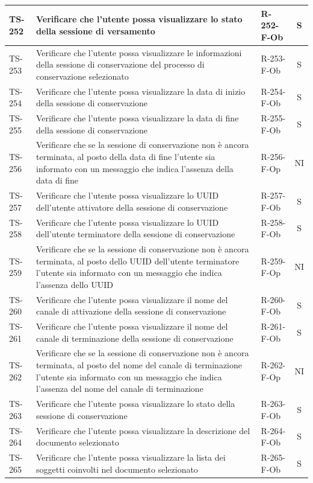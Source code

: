 \documentclass[a4paper,12pt]{article}
\begin{document}
\begin{longtable}{|p{1.5cm}|p{8.3cm}|p{2.4cm}|c|}
\hline
TS-252 & Verificare che l'utente possa visualizzare lo stato della sessione di versamento & R-252-F-Ob & S \\
\hline
TS-253 & Verificare che l'utente possa visualizzare le informazioni della sessione di conservazione del processo di conservazione selezionato & R-253-F-Ob & S \\
\hline
TS-254 & Verificare che l'utente possa visualizzare la data di inizio della sessione di conservazione & R-254-F-Ob & S \\
\hline
TS-255 & Verificare che l'utente possa visualizzare la data di fine della sessione di conservazione & R-255-F-Ob & S \\
\hline
TS-256 & Verificare che se la sessione di conservazione non è ancora terminata, al posto della data di fine l'utente sia informato con un messaggio che indica l'assenza della data di fine & R-256-F-Op & NI \\
\hline
TS-257 & Verificare che l'utente possa visualizzare lo UUID dell'utente attivatore della sessione di conservazione & R-257-F-Ob & S \\
\hline
TS-258 & Verificare che l'utente possa visualizzare lo UUID dell'utente terminatore della sessione di conservazione & R-258-F-Ob & S \\
\hline
TS-259 & Verificare che se la sessione di conservazione non è ancora terminata, al posto dello UUID dell'utente terminatore l'utente sia informato con un messaggio che indica l'assenza dello UUID & R-259-F-Op & NI \\
\hline
TS-260 & Verificare che l'utente possa visualizzare il nome del canale di attivazione della sessione di conservazione & R-260-F-Ob & S \\
\hline
TS-261 & Verificare che l'utente possa visualizzare il nome del canale di terminazione della sessione di conservazione & R-261-F-Ob & S \\
\hline
TS-262 & Verificare che se la sessione di conservazione non è ancora terminata, al posto del nome del canale di terminazione l'utente sia informato con un messaggio che indica l'assenza del nome del canale di terminazione & R-262-F-Op & NI \\
\hline
TS-263 & Verificare che l'utente possa visualizzare lo stato della sessione di conservazione & R-263-F-Ob & S \\
\hline
TS-264 & Verificare che l'utente possa visualizzare la descrizione del documento selezionato & R-264-F-Ob & S \\
\hline
TS-265 & Verificare che l'utente possa visualizzare la lista dei soggetti coinvolti nel documento selezionato & R-265-F-Ob & S \\

\end{longtable}
\end{document}
